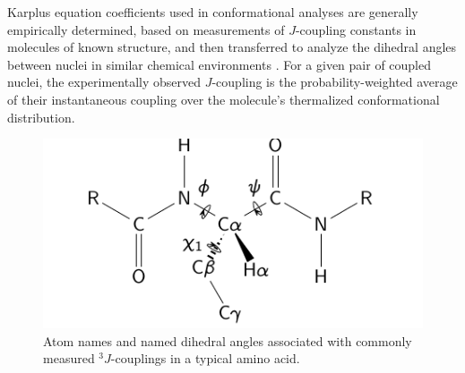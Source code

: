 \documentclass[9pt,review]{livecoms}
\begin{document}
Karplus equation coefficients used in conformational analyses are generally empirically determined, based on measurements of $J$-coupling constants in molecules of known structure, and then transferred to analyze the dihedral angles between nuclei in similar chemical environments \cite{karplus_contact_1959,karplus_vicinal_1963,haasnoot_relationship_1980,wang_determination_1996,vogeli_limits_2007}.
For a given pair of coupled nuclei, the experimentally observed $J$-coupling is the probability-weighted average of their instantaneous coupling over the molecule’s thermalized conformational distribution.

\begin{figure}[t]
    \centering
    \label{fig:dihedrals}
    \includegraphics[width=3 in]{paper/figures/protein-dihedrals.pdf}
    \caption{Atom names and named dihedral angles associated with commonly measured $^3J$-couplings in a typical amino acid.}
\end{figure}
\end{document}
